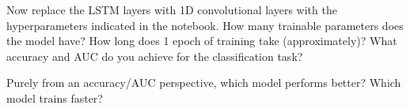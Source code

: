 \begin{problem}[15]
Now replace the LSTM layers with 1D convolutional layers with the hyperparameters indicated in the notebook.
How many trainable parameters does the model have?
How long does 1 epoch of training take (approximately)?
What accuracy and AUC do you achieve for the classification task?
\end{problem}

\begin{problem}[10]
Purely from an accuracy/AUC perspective, which model performs better?
Which model trains faster?
\end{problem}


